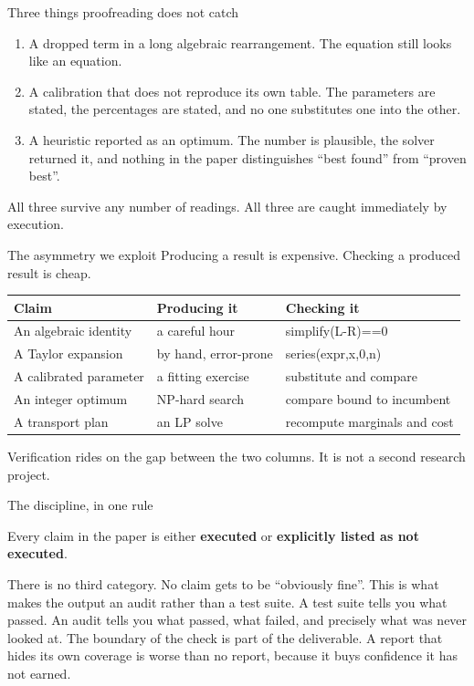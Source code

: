 \documentclass[aspectratio=169,11pt]{beamer}
\newcommand{\code}[1]{{\ttfamily\small #1}}
\begin{document}
\begin{frame}{Three things proofreading does not catch}
  \begin{enumerate}\itemsep0.6em
    \item A \alert{dropped term} in a long algebraic rearrangement. The equation still looks
          like an equation.
    \item A \alert{calibration that does not reproduce its own table}. The parameters are
          stated, the percentages are stated, and no one substitutes one into the other.
    \item A \alert{heuristic reported as an optimum}. The number is plausible, the solver
          returned it, and nothing in the paper distinguishes ``best found'' from ``proven best''.
  \end{enumerate}
  \vfill
  All three survive any number of readings. All three are caught immediately by execution.
\end{frame}

\begin{frame}{The asymmetry we exploit}
  Producing a result is expensive. \alert{Checking a produced result is cheap.}
  \vfill
  \begin{center}
  \begin{tabular}{@{}p{}p{}p{}@{}}
    \toprule
    \textbf{Claim} & \textbf{Producing it} & \textbf{Checking it} \\
    \midrule
    An algebraic identity & a careful hour & \code{simplify(L-R)==0} \\[0.35em]
    A Taylor expansion & by hand, error-prone & \code{series(expr,x,0,n)} \\[0.35em]
    A calibrated parameter & a fitting exercise & substitute and compare \\[0.35em]
    An integer optimum & NP-hard search & compare bound to incumbent \\[0.35em]
    A transport plan & an LP solve & recompute marginals and cost \\
    \bottomrule
  \end{tabular}
  \end{center}
  \vfill
  Verification rides on the gap between the two columns. It is not a second research project.
\end{frame}

\begin{frame}{The discipline, in one rule}
  \begin{block}{}
  \centering\large
  Every claim in the paper is either \textbf{executed} or \textbf{explicitly listed as not executed}.
  \end{block}
  \vfill
  There is no third category. No claim gets to be ``obviously fine''.
  \vfill
  This is what makes the output an \alert{audit} rather than a test suite. A test suite tells you
  what passed. An audit tells you what passed, what failed, and \alert{precisely what was never looked at}.
  \vfill
  {\color{slate} The boundary of the check is part of the deliverable. A report that hides its own
  coverage is worse than no report, because it buys confidence it has not earned.}
\end{frame}
\end{document}
